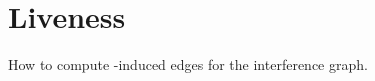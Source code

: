 \documentclass[12pt]{article}
\begin{document}
\section{\AMi Liveness}

How to compute \AMi-induced edges for the interference graph.

\begin{algorithm}
\end{algorithm}
\end{document}
